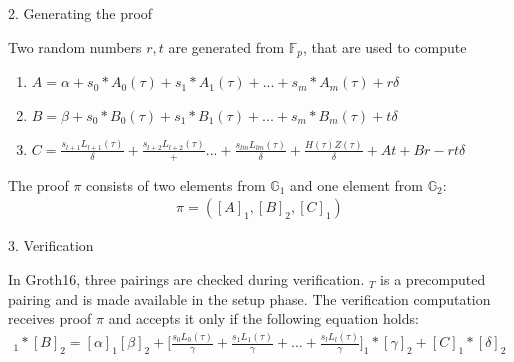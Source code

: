 2. Generating the proof

Two random numbers \(r, t\) are generated from \begin{math}\mathbb{F}_p\end{math}, that are used to compute

\begin{enumerate}
    \item \begin{math} A= \alpha + s_0*A_0(\tau) + s_1*A_1(\tau) + ... + s_m*A_m(\tau) + r\delta\end{math}
    \item \begin{math} B= \beta + s_0*B_0(\tau) + s_1*B_1(\tau) + ... + s_m*B_m(\tau) + t\delta\end{math}
    \item \begin{math} C= \frac{s_{l+1}L_{l+1}(\tau)}{\delta} + \frac{s_{l+2}L_{l+2}(\tau)} + ... +\frac{s_{lm}L_{lm}(\tau)}{\delta} + \frac{H(\tau)Z(\tau)}{\delta} + At + Br - rt\delta\end{math}
\end{enumerate}

The proof \begin{math}\pi\end{math} consists of two elements from \begin{math}\mathbb{G}_1\end{math} and one element from \begin{math}\mathbb{G}_2\end{math}:
\begin{align}
    \pi = ([A]_1, [B]_2, [C]_1)
\end{align}

3. Verification

In Groth16, three pairings are checked during verification. \begin{math}[\alpha * \beta]_T\end{math} is a precomputed pairing and is made available in the setup phase. The verification computation receives proof \begin{math} \pi\end{math} and accepts it only if the following equation holds:
\begin{align}
    [A]_1 * [B]_2 = [\alpha]_1[\beta]_2 + \bigl[\frac{s_0L_0(\tau)}{\gamma}+ \frac{s_1L_1(\tau)}{\gamma} + ... + \frac{s_lL_l(\tau)}{\gamma}\bigr]_1 * [\gamma]_2 + [C]_1 * [\delta]_2
\end{align}

